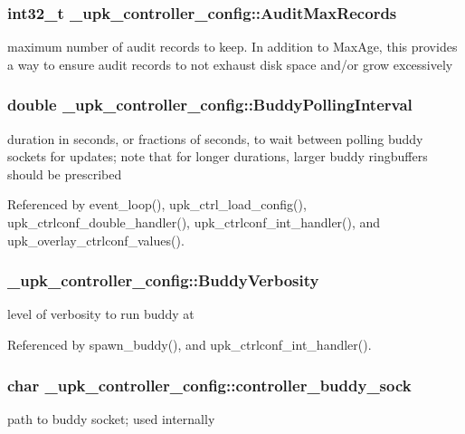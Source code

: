 \subsubsection[{AuditMaxRecords}]{\setlength{\rightskip}{0pt plus 5cm}int32\_\-t {\bf \_\-upk\_\-controller\_\-config::AuditMaxRecords}}\label{struct__upk__controller__config_a0fbc43b5b43df3c7d127bc326efeb367}
maximum number of audit records to keep. In addition to MaxAge, this provides a way to ensure audit records to not exhaust disk space and/or grow excessively 
\subsubsection[{BuddyPollingInterval}]{\setlength{\rightskip}{0pt plus 5cm}double {\bf \_\-upk\_\-controller\_\-config::BuddyPollingInterval}}\label{struct__upk__controller__config_ae7689d54900beb4a7a07839bca6e044e}
duration in seconds, or fractions of seconds, to wait between polling buddy sockets for updates; note that for longer durations, larger buddy ringbuffers should be prescribed 

Referenced by event\_\-loop(), upk\_\-ctrl\_\-load\_\-config(), upk\_\-ctrlconf\_\-double\_\-handler(), upk\_\-ctrlconf\_\-int\_\-handler(), and upk\_\-overlay\_\-ctrlconf\_\-values().

\subsubsection[{BuddyVerbosity}]{ {\bf \_\-upk\_\-controller\_\-config::BuddyVerbosity}}\label{struct__upk__controller__config_a650392bc370a2a53ec1f7d556b77e69b}
level of verbosity to run buddy at 

Referenced by spawn\_\-buddy(), and upk\_\-ctrlconf\_\-int\_\-handler().

\subsubsection[{controller\_\-buddy\_\-sock}]{\setlength{\rightskip}{0pt plus 5cm}char {\bf \_\-upk\_\-controller\_\-config::controller\_\-buddy\_\-sock}}\label{struct__upk__controller__config_aec104fe1f03fe934e2e2f2628b75a4b9}
path to buddy socket; used internally 

